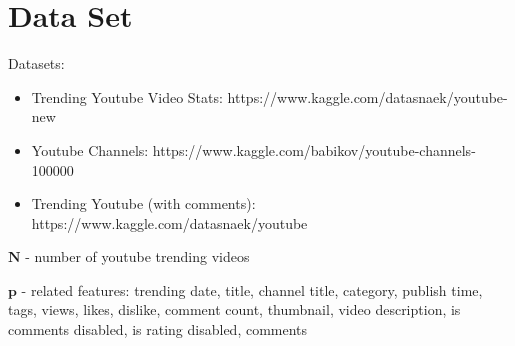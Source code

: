 \documentclass[english]{article}
\begin{document}
\section{Data Set}
Datasets:
\begin{itemize}
\item Trending Youtube Video Stats: https://www.kaggle.com/datasnaek/youtube-new
\item Youtube Channels: https://www.kaggle.com/babikov/youtube-channels-100000
\item Trending Youtube (with comments): https://www.kaggle.com/datasnaek/youtube
\end{itemize}
\item $\textbf{N}$ - number of youtube trending videos
\item $\textbf{p}$ - related features: trending date, title, channel title, category, publish time, tags, views, likes, dislike, comment count, thumbnail, video description, is comments disabled, is rating disabled, comments
\end{document}
